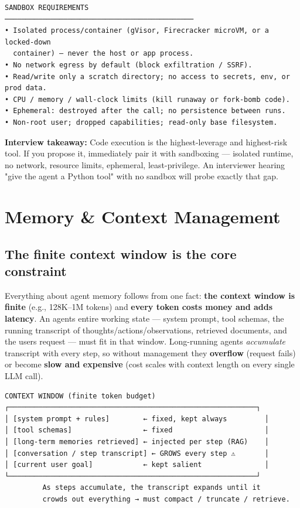 \documentclass[11pt]{article}
\begin{document}
\setcodelang{}

\begin{verbatim}
SANDBOX REQUIREMENTS
─────────────────────────────────────────────
• Isolated process/container (gVisor, Firecracker microVM, or a locked-down
  container) — never the host or app process.
• No network egress by default (block exfiltration / SSRF).
• Read/write only a scratch directory; no access to secrets, env, or prod data.
• CPU / memory / wall-clock limits (kill runaway or fork-bomb code).
• Ephemeral: destroyed after the call; no persistence between runs.
• Non-root user; dropped capabilities; read-only base filesystem.
\end{verbatim}

\textbf{Interview takeaway:} Code execution is the highest-leverage and highest-risk tool. If you propose it, immediately pair it with sandboxing --- isolated runtime, no network, resource limits, ephemeral, least-privilege. An interviewer hearing "give the agent a Python tool" with no sandbox will probe exactly that gap.

\section{Memory \& Context Management}\label{memory--context-management}

\subsection{The finite context window is the core constraint}\label{the-finite-context-window-is-the-core-constraint}

Everything about agent memory follows from one fact: \textbf{the context window is finite} (e.g., 128K--1M tokens) and \textbf{every token costs money and adds latency}. An agent\textquotesingle s entire working state --- system prompt, tool schemas, the running transcript of thoughts/actions/observations, retrieved documents, and the user\textquotesingle s request --- must fit in that window. Long-running agents \emph{accumulate} transcript with every step, so without management they \textbf{overflow} (request fails) or become \textbf{slow and expensive} (cost scales with context length on every single LLM call).

\setcodelang{}

\begin{verbatim}
CONTEXT WINDOW (finite token budget)
┌───────────────────────────────────────────────────────────┐
│ [system prompt + rules]        ← fixed, kept always         │
│ [tool schemas]                 ← fixed                      │
│ [long-term memories retrieved] ← injected per step (RAG)    │
│ [conversation / step transcript] ← GROWS every step ⚠       │
│ [current user goal]            ← kept salient               │
└───────────────────────────────────────────────────────────┘
         As steps accumulate, the transcript expands until it
         crowds out everything → must compact / truncate / retrieve.
\end{verbatim}
\end{document}
